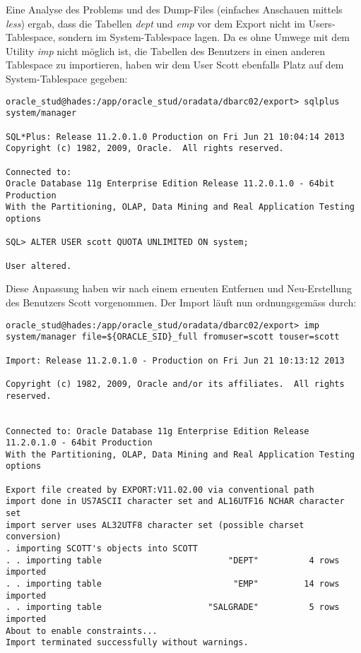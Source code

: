 \documentclass[11pt,a4paper,parskip=half]{scrartcl}
\begin{document}
Eine Analyse des Problems und des Dump-Files (einfaches Anschauen mittels \emph{less}) ergab, dass die Tabellen \emph{dept} und \emph{emp} vor dem Export nicht im Users-Tablespace, sondern im System-Tablespace lagen. Da es ohne Umwege mit dem Utility \emph{imp} nicht möglich ist, die Tabellen des Benutzers in einen anderen Tablespace zu importieren, haben wir dem User Scott ebenfalls Platz auf dem System-Tablespace gegeben:
\begin{lstlisting}
oracle_stud@hades:/app/oracle_stud/oradata/dbarc02/export> sqlplus system/manager

SQL*Plus: Release 11.2.0.1.0 Production on Fri Jun 21 10:04:14 2013
Copyright (c) 1982, 2009, Oracle.  All rights reserved.

Connected to:
Oracle Database 11g Enterprise Edition Release 11.2.0.1.0 - 64bit Production
With the Partitioning, OLAP, Data Mining and Real Application Testing options

SQL> ALTER USER scott QUOTA UNLIMITED ON system;

User altered.
\end{lstlisting}

Diese Anpassung haben wir nach einem erneuten Entfernen und Neu-Erstellung des Benutzers Scott vorgenommen. Der Import läuft nun ordnungsgemäss durch:
\begin{lstlisting}
oracle_stud@hades:/app/oracle_stud/oradata/dbarc02/export> imp system/manager file=${ORACLE_SID}_full fromuser=scott touser=scott

Import: Release 11.2.0.1.0 - Production on Fri Jun 21 10:13:12 2013

Copyright (c) 1982, 2009, Oracle and/or its affiliates.  All rights reserved.


Connected to: Oracle Database 11g Enterprise Edition Release 11.2.0.1.0 - 64bit Production
With the Partitioning, OLAP, Data Mining and Real Application Testing options

Export file created by EXPORT:V11.02.00 via conventional path
import done in US7ASCII character set and AL16UTF16 NCHAR character set
import server uses AL32UTF8 character set (possible charset conversion)
. importing SCOTT's objects into SCOTT
. . importing table                         "DEPT"          4 rows imported
. . importing table                          "EMP"         14 rows imported
. . importing table                     "SALGRADE"          5 rows imported
About to enable constraints...
Import terminated successfully without warnings.
\end{lstlisting}
\end{document}
